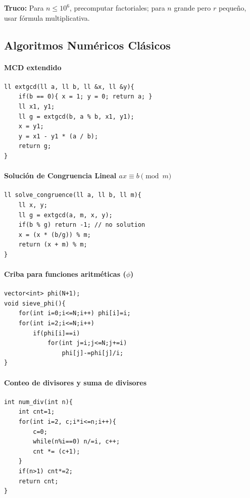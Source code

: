 \documentclass{article}
\begin{document}
\textbf{Truco:}  
Para \(n \le 10^6\), precomputar factoriales; para \(n\) grande pero \(r\) pequeño, usar fórmula multiplicativa.


\subsection{Algoritmos Numéricos Clásicos}

\paragraph{MCD extendido}
\begin{lstlisting}[style=cppstyle]
ll extgcd(ll a, ll b, ll &x, ll &y){
    if(b == 0){ x = 1; y = 0; return a; }
    ll x1, y1;
    ll g = extgcd(b, a % b, x1, y1);
    x = y1;
    y = x1 - y1 * (a / b);
    return g;
}
\end{lstlisting}

\paragraph{Solución de Congruencia Lineal \(a x \equiv b \pmod{m}\)}
\begin{lstlisting}[style=cppstyle]
ll solve_congruence(ll a, ll b, ll m){
    ll x, y;
    ll g = extgcd(a, m, x, y);
    if(b % g) return -1; // no solution
    x = (x * (b/g)) % m;
    return (x + m) % m;
}
\end{lstlisting}

\paragraph{Criba para funciones aritméticas (\(\phi\))}
\begin{lstlisting}[style=cppstyle]
vector<int> phi(N+1);
void sieve_phi(){
    for(int i=0;i<=N;i++) phi[i]=i;
    for(int i=2;i<=N;i++)
        if(phi[i]==i)
            for(int j=i;j<=N;j+=i)
                phi[j]-=phi[j]/i;
}
\end{lstlisting}

\paragraph{Conteo de divisores y suma de divisores}
\begin{lstlisting}[style=cppstyle]
int num_div(int n){
    int cnt=1;
    for(int i=2, c;i*i<=n;i++){
        c=0;
        while(n%i==0) n/=i, c++;
        cnt *= (c+1);
    }
    if(n>1) cnt*=2;
    return cnt;
}
\end{lstlisting}
\end{document}
